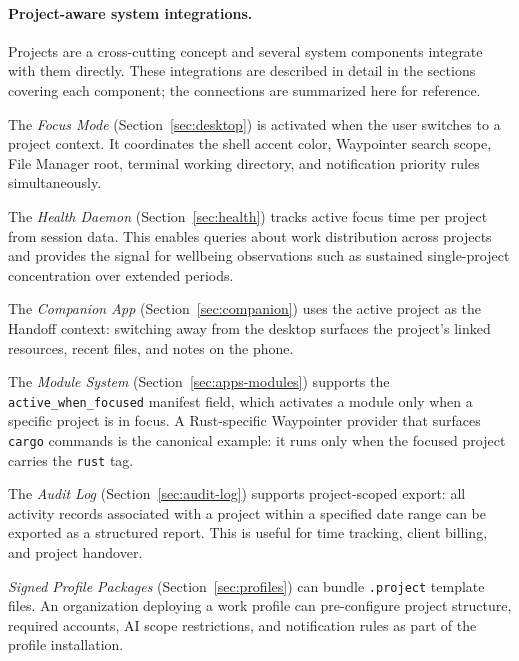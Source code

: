 \paragraph{Project-aware system integrations.}
Projects are a cross-cutting concept and several system components integrate
with them directly. These integrations are described in detail in the
sections covering each component; the connections are summarized here for
reference.

The \emph{Focus Mode} (Section~\ref{sec:desktop}) is activated when the user
switches to a project context. It coordinates the shell accent color, Waypointer
search scope, File Manager root, terminal working directory, and notification
priority rules simultaneously.

The \emph{Health Daemon} (Section~\ref{sec:health}) tracks active focus time
per project from session data. This enables queries about work distribution
across projects and provides the signal for wellbeing observations such as
sustained single-project concentration over extended periods.

The \emph{Companion App} (Section~\ref{sec:companion}) uses the active project
as the Handoff context: switching away from the desktop surfaces the project's
linked resources, recent files, and notes on the phone.

The \emph{Module System} (Section~\ref{sec:apps-modules}) supports the
\texttt{active\_when\_focused} manifest field, which activates a module only
when a specific project is in focus. A Rust-specific Waypointer provider that
surfaces \texttt{cargo} commands is the canonical example: it runs only when
the focused project carries the \texttt{rust} tag.

The \emph{Audit Log} (Section~\ref{sec:audit-log}) supports project-scoped
export: all activity records associated with a project within a specified date
range can be exported as a structured report. This is useful for time tracking,
client billing, and project handover.

\emph{Signed Profile Packages} (Section~\ref{sec:profiles}) can bundle
\texttt{.project} template files. An organization deploying a work profile
can pre-configure project structure, required accounts, AI scope restrictions,
and notification rules as part of the profile installation.

